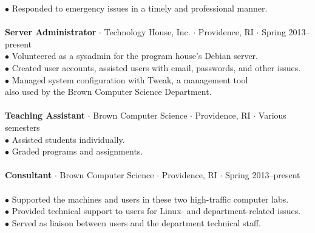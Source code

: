 \documentclass{res}
\newcommand{\sectionVspace}{\vspace{-0.40in}}
\newcommand{\sbreak}{\\[-0.15in]}
\begin{document}
\begin{resume}
\begin{tabbing}
            \>$\bullet$ Responded to emergency issues in a timely and professional manner.\\
        \sbreak
        {\bf Server Administrator} $\cdot$ Technology House, Inc. $\cdot$ Providence, RI $\cdot$ Spring 2013--present\\
            \>$\bullet$ Volunteered as a sysadmin for the program house's Debian server.\\
            \>$\bullet$ Created user accounts, assisted users with email, passwords, and other issues.\\
            \>$\bullet$ Managed system configuration with Tweak, a management tool\\
            \>\phantom{$\bullet$} also used by the Brown Computer Science Department.\\
        \sbreak
        {\bf Teaching Assistant} $\cdot$ Brown Computer Science $\cdot$ Providence, RI $\cdot$ Various semesters\\
            \>$\bullet$  Assisted students individually.\\
            \>$\bullet$  Graded programs and assignments.\\
        \sbreak
        {\bf Consultant} $\cdot$ Brown Computer Science $\cdot$ Providence, RI $\cdot$ Spring 2013--present\\
            \\
            \>$\bullet$ Supported the machines and users in these two high-traffic computer labs.\\
            \>$\bullet$ Provided technical support to users for Linux- and department-related issues.\\
            \>$\bullet$ Served as  liaison between users and the department technical staff.\\
   \end{tabbing}
\sectionVspace

\end{resume}
\end{document}
